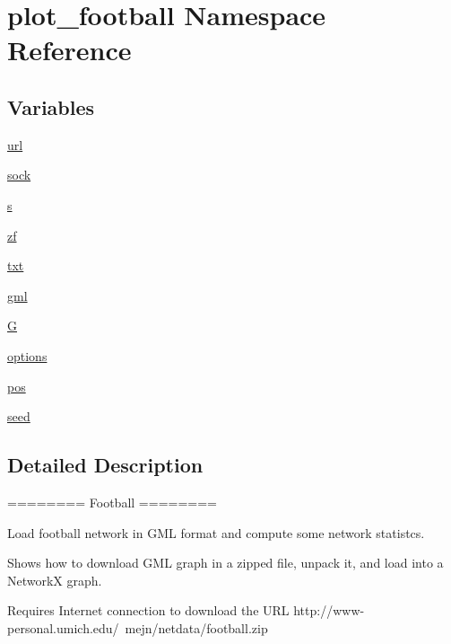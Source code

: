 \hypertarget{namespaceplot__football}{}\section{plot\+\_\+football Namespace Reference}
\label{namespaceplot__football}
\subsection*{Variables}
\begin{DoxyCompactItemize}
\item 
\hyperlink{namespaceplot__football_a4aba4ef844afa43cf500d2654edb9720}{url}
\item 
\hyperlink{namespaceplot__football_a6c6817848a022135c0c0ead1686f2a17}{sock}
\item 
\hyperlink{namespaceplot__football_a38ddab3d578dcd43a1ea4cc7b13e4d36}{s}
\item 
\hyperlink{namespaceplot__football_aa04c904522beed61fa5f487da70262fc}{zf}
\item 
\hyperlink{namespaceplot__football_a4f8ea9a0c313430226956d8bc628d7e7}{txt}
\item 
\hyperlink{namespaceplot__football_a23ebb95dfd181200bf12051139ce2319}{gml}
\item 
\hyperlink{namespaceplot__football_a1c2ab59274d81a26e0c37c7b87818732}{G}
\item 
\hyperlink{namespaceplot__football_a478a6b6db4d7a788f67cd4a2164e8fd0}{options}
\item 
\hyperlink{namespaceplot__football_ac26b2765f8d60727d49475c1e21d51d1}{pos}
\item 
\hyperlink{namespaceplot__football_a37f6dbeb52b81ebe1522c64d1a0ce356}{seed}
\end{DoxyCompactItemize}


\subsection{Detailed Description}
\begin{DoxyVerb}========
Football
========

Load football network in GML format and compute some network statistcs.

Shows how to download GML graph in a zipped file, unpack it, and load
into a NetworkX graph.

Requires Internet connection to download the URL
http://www-personal.umich.edu/~mejn/netdata/football.zip
\end{DoxyVerb}
 

